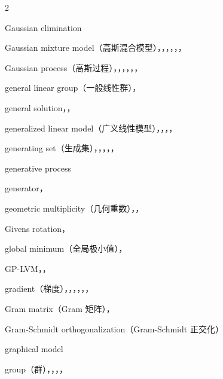 \begin{multicols}{2}
\medskip{}\par\smallskip
\noindent Gaussian elimination\par
\noindent Gaussian mixture model（高斯混合模型），，，，，，\par
\noindent Gaussian process（高斯过程），，，，，，\par
\noindent general linear group（一般线性群），\par
\noindent general solution，，\par
\noindent generalized linear model（广义线性模型），，，，\par
\noindent generating set（生成集），，，，，\par
\noindent generative process\par
\noindent generator，\par
\noindent geometric multiplicity（几何重数），，\par
\noindent Givens rotation，\par
\noindent global minimum（全局极小值），\par
\noindent GP-LVM，，\par
\noindent gradient（梯度），，，，，，\par
\noindent Gram matrix（Gram 矩阵），\par
\noindent Gram-Schmidt orthogonalization（Gram-Schmidt 正交化）\par
\noindent graphical model\par
\noindent group（群），，，，\par


\end{multicols}
